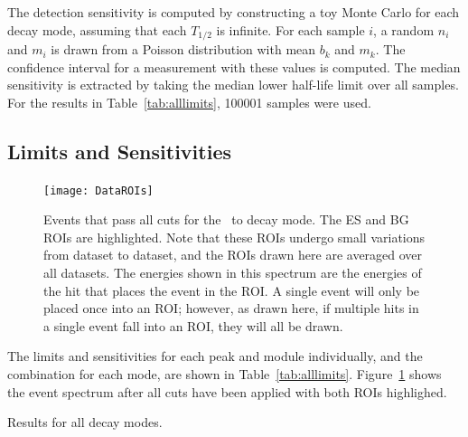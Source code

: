 \documentclass[/main.tex]{subfiles}
\begin{document}
The detection sensitivity is computed by constructing a toy Monte Carlo for each decay mode, assuming that each $T_{1/2}$ is infinite.
For each sample $i$, a random $n_i$ and $m_i$ is drawn from a Poisson distribution with mean $b_k$ and $m_k$.
The confidence interval for a measurement with these values is computed.
The median sensitivity is extracted by taking the median lower half-life limit over all samples.
For the results in Table~\ref{tab:alllimits}, 100001 samples were used.

\subsection{Limits and Sensitivities}
\begin{figure}[h]
  \centering
  \texttt{[image: DataROIs]}
  \caption[Measured events after all cuts with ROIs drawn]{\label{fig:roievents}
    Events that pass all cuts for the \tnbb\ to  decay mode. The ES and BG ROIs are highlighted. Note that these ROIs undergo small variations from dataset to dataset, and the ROIs drawn here are averaged over all datasets. The energies shown in this spectrum are the energies of the hit that places the event in the ROI. A single event will only be placed once into an ROI; however, as drawn here, if multiple hits in a single event fall into an ROI, they will all be drawn.
  }
\end{figure}
The limits and sensitivities for each peak and module individually, and the combination for each mode, are shown in Table~\ref{tab:alllimits}.
Figure~\ref{fig:roievents} shows the event spectrum after all cuts have been applied with both ROIs highlighed.

\begin{table}[h]
  \scriptsize
  \centering
  
  \caption[Final results for all decay modes]{ \label{tab:alllimits}
    Results for all decay modes.
  }
\end{table}

\onlyinsubfile{
  
  
}
\end{document}
